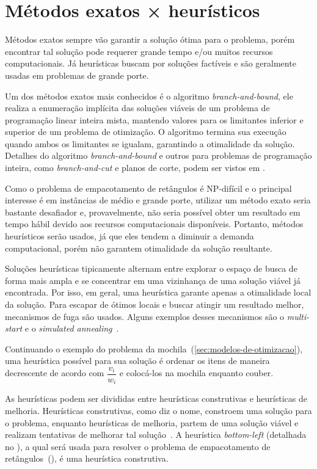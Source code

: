 \section{Métodos exatos × heurísticos}\label{sec:metodos-exatos-heuristicos}

Métodos exatos sempre vão garantir a solução ótima para o problema, porém encontrar
tal solução pode requerer grande tempo e/ou muitos recursos computacionais.
Já heurísticas buscam por soluções factíveis e são geralmente usadas em problemas de grande porte.

Um dos métodos exatos mais conhecidos é o algoritmo \textit{branch-and-bound}, ele realiza a
enumeração implícita das soluções viáveis de um problema de programação linear inteira mista,
mantendo valores para os limitantes inferior e superior de um problema de otimização.
O algoritmo termina sua execução quando ambos os limitantes se igualam, garantindo a otimalidade
da solução.
Detalhes do algoritmo \textit{branch-and-bound} e outros para problemas de programação inteira,
como \textit{branch-and-cut} e planos de corte, podem ser vistos em .

Como o problema de empacotamento de retângulos é NP-difícil e o principal interesse é em instâncias
de médio e grande porte, utilizar um método exato seria bastante desafiador e, provavelmente,
não seria possível obter um resultado em tempo hábil devido aos recursos computacionais disponíveis.
Portanto, métodos heurísticos serão usados, já que eles tendem a diminuir a demanda computacional,
porém não garantem otimalidade da solução resultante.

Soluções heurísticas tipicamente alternam entre explorar o espaço de busca de forma mais ampla
e se concentrar em uma vizinhança de uma solução viável já encontrada.
Por isso, em geral, uma heurística garante apenas a otimalidade local da solução.
Para escapar de ótimos locais e buscar atingir um resultado melhor, mecanismos de fuga são usados.
Alguns exemplos desses mecanismos são o \textit{multi-start} e o \textit{simulated annealing}~\cite{
    firat2020effective,rakotonirainy2020improved,hopper2001empirical}.

Continuando o exemplo do problema da mochila~(\cref{sec:modelos-de-otimizacao}), uma heurística
possível para sua solução é ordenar os itens de maneira decrescente de acordo com $\dfrac{v_i}{w_i}$
e colocá-los na mochila enquanto couber.

As heurísticas podem ser divididas entre heurísticas construtivas e heurísticas de melhoria.
Heurísticas construtivas, como diz o nome, constroem uma solução para o problema,
enquanto heurísticas de melhoria, partem de uma solução viável e realizam tentativas de
melhorar tal solução~\cite{michalewicz2013solve}.
A heurística \textit{bottom-left} (detalhada no ), a qual será usada para
resolver o problema de empacotamento de retângulos~(),
é uma heurística construtiva.